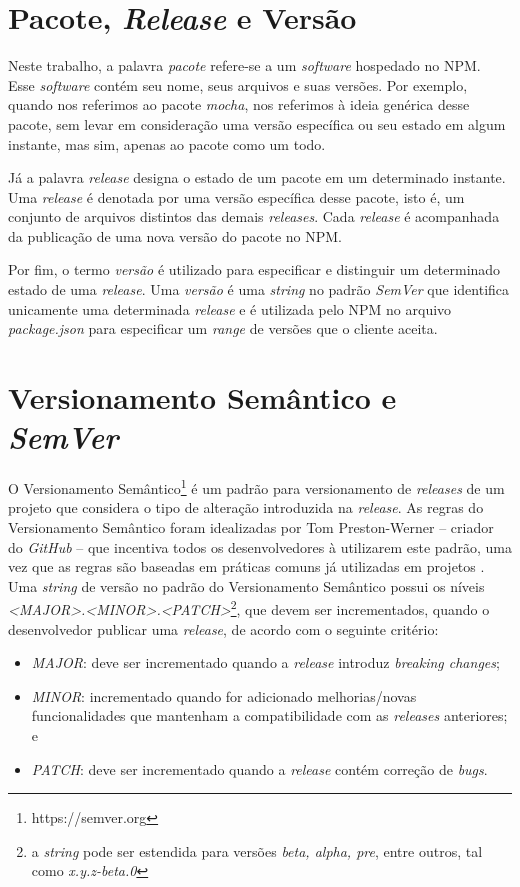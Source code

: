 \section{Pacote, \textit{Release} e Versão}
\label{ref-teo:pac_rel_ver}
Neste trabalho, a palavra \textit{pacote} refere-se a um \textit{software} hospedado no \gls{NPM}. Esse \textit{software} contém seu nome, seus arquivos e suas versões. Por exemplo, quando nos referimos ao pacote \textit{mocha}, nos referimos à ideia genérica desse pacote, sem levar em consideração uma versão específica ou seu estado em algum instante, mas sim, apenas ao pacote como um todo.

Já a palavra \textit{release} designa o estado de um pacote em um determinado instante. Uma \textit{release} é denotada por uma versão específica desse pacote, isto é, um conjunto de arquivos distintos das demais \textit{releases}. Cada \textit{release} é acompanhada da publicação de uma nova versão do pacote no \gls{NPM}.

Por fim, o termo \textit{versão} é utilizado para especificar e distinguir um determinado estado de uma \textit{release}. Uma \textit{versão} é uma \textit{string} no padrão \textit{SemVer} que identifica unicamente uma determinada \textit{release} e é utilizada pelo \gls{NPM} no arquivo \textit{package.json} para especificar um \textit{range} de versões que o cliente aceita.

\section{Versionamento Semântico e \textit{SemVer}}
\label{ref-teo:semver}
O Versionamento Semântico\footnote{https://semver.org} é um padrão para versionamento de \textit{releases} de um projeto que considera o tipo de alteração introduzida na \textit{release}. As regras do Versionamento Semântico foram idealizadas por Tom Preston-Werner -- criador do \textit{GitHub} -- que incentiva todos os desenvolvedores à utilizarem este padrão, uma vez que as regras são baseadas em práticas comuns já utilizadas em projetos \cite{teorical_reference:semver}. Uma \textit{string} de versão no padrão do Versionamento Semântico possui os níveis \textit{<MAJOR>.<MINOR>.<PATCH>}\footnote{a \textit{string} pode ser estendida para versões \textit{beta, alpha, pre}, entre outros, tal como \textit{x.y.z-beta.0}}, que devem ser incrementados, quando o desenvolvedor publicar uma \textit{release}, de acordo com o seguinte critério:

\begin{itemize}
    \item \textit{MAJOR}: deve ser incrementado quando a \textit{release} introduz \textit{breaking changes};
    \item \textit{MINOR}: incrementado quando for adicionado melhorias/novas funcionalidades que mantenham a compatibilidade com as \textit{releases} anteriores; e
    \item \textit{PATCH}: deve ser incrementado quando a \textit{release} contém correção de \textit{bugs}.
\end{itemize}{}

